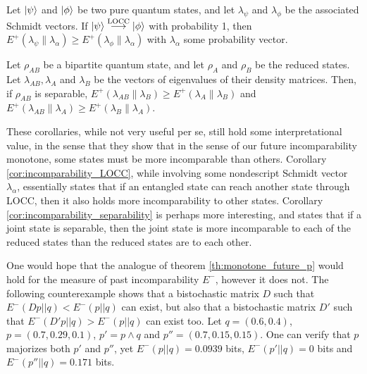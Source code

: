 \begin{corollary} \label{cor:incomparability_LOCC}
    Let $\ket{\psi}$ and $\ket{\phi}$ be two pure quantum states, and let $\lambda_\psi$ and $\lambda_\phi$ be the associated Schmidt vectors. If $\ket{\psi} \overset{\text{LOCC}}{\longrightarrow} \ket{\phi}$ with probability 1, then $E^+ (\lambda_\psi \parallel \lambda_\alpha) \geq E^+ (\lambda_\phi \parallel \lambda_\alpha)$ with $\lambda_\alpha$ some probability vector.
\end{corollary}

\begin{corollary} \label{cor:incomparability_separability}
    Let $\rho_{AB}$ be a bipartite quantum state, and let $\rho_A$ and $\rho_B$ be the reduced states. Let $\lambda_{AB}, \lambda_A$ and $\lambda_B$ be the vectors of eigenvalues of their density matrices. Then, if $\rho_{AB}$ is separable, $E^+ (\lambda_{AB} \parallel \lambda_B) \geq E^+ (\lambda_A \parallel \lambda_B)$ and $E^+ (\lambda_{AB} \parallel \lambda_A) \geq E^+ (\lambda_B \parallel \lambda_A)$.
\end{corollary}

These corollaries, while not very useful per se, still hold some interpretational value, in the sense that they show that in the sense of our future incomparability monotone, some states must be more incomparable than others. Corollary \ref{cor:incomparability_LOCC}, while involving some nondescript Schmidt vector $\lambda_\alpha$, essentially states that if an entangled state can reach another state through LOCC, then it also holds more incomparability to other states. Corollary \ref{cor:incomparability_separability} is perhaps more interesting, and states that if a joint state is separable, then the joint state is more incomparable to each of the reduced states than the reduced states are to each other.

One would hope that the analogue of theorem \ref{th:monotone_future_p} would hold for the measure of past incomparability $E^-$, however it does not. The following counterexample shows that a bistochastic matrix $D$ such that $E^- (Dp || q) < E^- (p || q)$ can exist, but also that a bistochastic matrix $D'$ such that $E^- (D'p || q) > E^- (p || q)$ can exist too. Let $q = (0.6, 0.4)$, $p = (0.7, 0.29, 0.1)$, $p' = p \wedge q$ and $p'' = (0.7, 0.15, 0.15)$. One can verify that $p$ majorizes both $p'$ and $p''$, yet $E^- (p || q) = 0.0939$ bits, $E^- (p' || q) = 0$ bits and $E^- (p'' || q) = 0.171$ bits.



